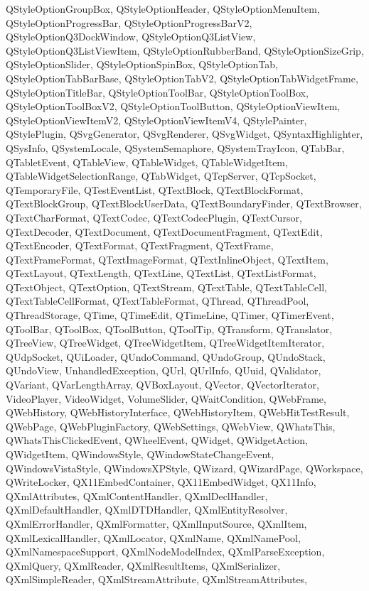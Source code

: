 {{QStyleOptionGroupBox, QStyleOptionHeader, QStyleOptionMenuItem,
QStyleOptionProgressBar, QStyleOptionProgressBarV2, QStyleOptionQ3DockWindow,
QStyleOptionQ3ListView, QStyleOptionQ3ListViewItem, QStyleOptionRubberBand,
QStyleOptionSizeGrip, QStyleOptionSlider, QStyleOptionSpinBox, QStyleOptionTab,
QStyleOptionTabBarBase, QStyleOptionTabV2, QStyleOptionTabWidgetFrame,
QStyleOptionTitleBar, QStyleOptionToolBar, QStyleOptionToolBox,
QStyleOptionToolBoxV2, QStyleOptionToolButton, QStyleOptionViewItem,
QStyleOptionViewItemV2, QStyleOptionViewItemV4, QStylePainter, QStylePlugin,
QSvgGenerator, QSvgRenderer, QSvgWidget, QSyntaxHighlighter, QSysInfo,
QSystemLocale, QSystemSemaphore, QSystemTrayIcon, QTabBar, QTabletEvent,
QTableView, QTableWidget, QTableWidgetItem, QTableWidgetSelectionRange,
QTabWidget, QTcpServer, QTcpSocket, QTemporaryFile, QTestEventList, QTextBlock,
QTextBlockFormat, QTextBlockGroup, QTextBlockUserData, QTextBoundaryFinder,
QTextBrowser, QTextCharFormat, QTextCodec, QTextCodecPlugin, QTextCursor,
QTextDecoder, QTextDocument, QTextDocumentFragment, QTextEdit, QTextEncoder,
QTextFormat, QTextFragment, QTextFrame, QTextFrameFormat, QTextImageFormat,
QTextInlineObject, QTextItem, QTextLayout, QTextLength, QTextLine, QTextList,
QTextListFormat, QTextObject, QTextOption, QTextStream, QTextTable,
QTextTableCell, QTextTableCellFormat, QTextTableFormat, QThread, QThreadPool,
QThreadStorage, QTime, QTimeEdit, QTimeLine, QTimer, QTimerEvent, QToolBar,
QToolBox, QToolButton, QToolTip, QTransform, QTranslator, QTreeView,
QTreeWidget, QTreeWidgetItem, QTreeWidgetItemIterator, QUdpSocket, QUiLoader,
QUndoCommand, QUndoGroup, QUndoStack, QUndoView, UnhandledException, QUrl,
QUrlInfo, QUuid, QValidator, QVariant, QVarLengthArray, QVBoxLayout, QVector,
QVectorIterator, VideoPlayer, VideoWidget, VolumeSlider, QWaitCondition,
QWebFrame, QWebHistory, QWebHistoryInterface, QWebHistoryItem,
QWebHitTestResult, QWebPage, QWebPluginFactory, QWebSettings, QWebView,
QWhatsThis, QWhatsThisClickedEvent, QWheelEvent, QWidget, QWidgetAction,
QWidgetItem, QWindowsStyle, QWindowStateChangeEvent, QWindowsVistaStyle,
QWindowsXPStyle, QWizard, QWizardPage, QWorkspace, QWriteLocker,
QX11EmbedContainer, QX11EmbedWidget, QX11Info, QXmlAttributes,
QXmlContentHandler, QXmlDeclHandler, QXmlDefaultHandler, QXmlDTDHandler,
QXmlEntityResolver, QXmlErrorHandler, QXmlFormatter, QXmlInputSource, QXmlItem,
QXmlLexicalHandler, QXmlLocator, QXmlName, QXmlNamePool, QXmlNamespaceSupport,
QXmlNodeModelIndex, QXmlParseException, QXmlQuery, QXmlReader, QXmlResultItems,
QXmlSerializer, QXmlSimpleReader, QXmlStreamAttribute, QXmlStreamAttributes,
}}

